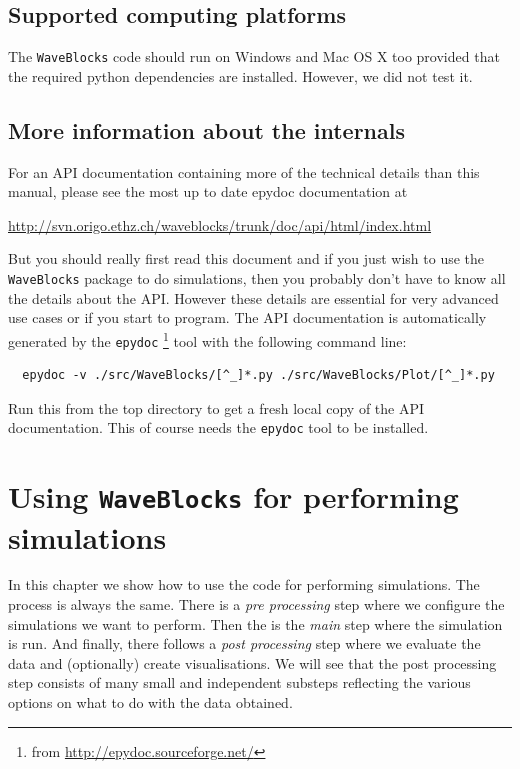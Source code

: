 \documentclass[a4paper,10pt]{report}
\begin{document}
\section{Supported computing platforms}

The \texttt{WaveBlocks} code should run on Windows and Mac OS X too provided
that the required python dependencies are installed. However, we did not test it.

\section{More information about the internals}

For an API documentation containing more of the technical details than this
manual, please see the most up to date epydoc documentation at

\begin{center}
  \url{http://svn.origo.ethz.ch/waveblocks/trunk/doc/api/html/index.html}
\end{center}

But you should really first read this document and if you just wish to use the
\texttt{WaveBlocks} package to do simulations, then you probably don't
have to know all the details about the API. However these details are
essential for very advanced use cases or if you start to program. The
API documentation is automatically generated by the \texttt{epydoc}
\footnote{from \url{http://epydoc.sourceforge.net/}} tool with the following
command line:

\begin{verbatim}
  epydoc -v ./src/WaveBlocks/[^_]*.py ./src/WaveBlocks/Plot/[^_]*.py
\end{verbatim}

Run this from the top directory to get a fresh local copy of the API documentation.
This of course needs the \texttt{epydoc} tool to be installed.


\chapter{Using \texttt{WaveBlocks} for performing simulations}

In this chapter we show how to use the code for performing simulations. The process
is always the same. There is a \emph{pre processing} step where we configure the
simulations we want to perform. Then the is the \emph{main} step where the simulation
is run. And finally, there follows a \emph{post processing} step where we evaluate
the data and (optionally) create visualisations. We will see that the post processing
step consists of many small and independent substeps reflecting the various options
on what to do with the data obtained.
\end{document}
